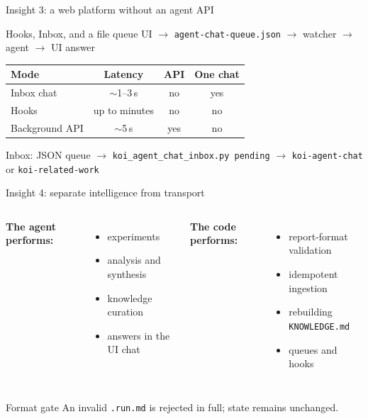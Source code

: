\documentclass[aspectratio=169,11pt]{beamer}
\begin{document}
\begin{frame}{Insight 3: a web platform without an agent API}
  \begin{block}{Hooks, Inbox, and a file queue}
    UI $\rightarrow$ \texttt{agent-chat-queue.json} $\rightarrow$ watcher $\rightarrow$ agent $\rightarrow$ UI answer
  \end{block}
  \begin{tabular}{lccc}
    \toprule
    Mode & Latency & API & One chat \\
    \midrule
    Inbox chat & $\sim$1--3\,s & no & yes \\
    Hooks & up to minutes & no & no \\
    Background API & $\sim$5\,s & yes & no \\
    \bottomrule
  \end{tabular}
  \vspace{0.5em}
  \small Inbox: JSON queue $\rightarrow$ \texttt{koi\_agent\_chat\_inbox.py pending} $\rightarrow$ \texttt{koi-agent-chat} or \texttt{koi-related-work}
\end{frame}

\begin{frame}{Insight 4: separate intelligence from transport}
  \begin{columns}[T]
    \textbf{The agent performs:}
    \begin{itemize}
      \item experiments
      \item analysis and synthesis
      \item knowledge curation
      \item answers in the UI chat
    \end{itemize}
    \textbf{The code performs:}
    \begin{itemize}
      \item report-format validation
      \item idempotent ingestion
      \item rebuilding \texttt{KNOWLEDGE.md}
      \item queues and hooks
    \end{itemize}
  \end{columns}
  \vspace{0.5em}
  \begin{alertblock}{Format gate}
    An invalid \texttt{.run.md} is rejected in full; state remains unchanged.
  \end{alertblock}
\end{frame}
\end{document}

